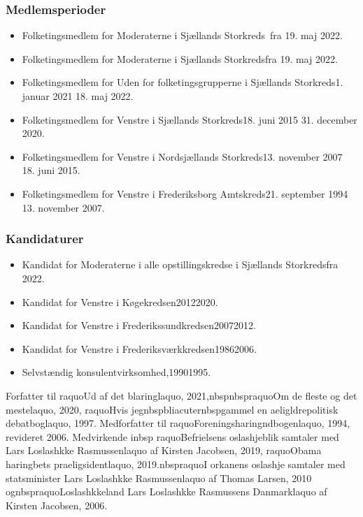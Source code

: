 \documentclass[11pt, a4paper]{awesome-cv}
\begin{document}
\begin{cvletter}
\subsubsection*{Medlemsperioder}
\begin{itemize}
\item Folketingsmedlem for Moderaterne i Sjællands Storkreds fra 19. maj 2022.
\item Folketingsmedlem for Moderaterne i Sjællands Storkredsfra 19. maj 2022.
\item Folketingsmedlem for Uden for folketingsgrupperne i Sjællands Storkreds1. januar 2021  18. maj 2022.
\item Folketingsmedlem for Venstre i Sjællands Storkreds18. juni 2015  31. december 2020.
\item Folketingsmedlem for Venstre i Nordsjællands Storkreds13. november 2007  18. juni 2015.
\item Folketingsmedlem for Venstre i Frederiksborg Amtskreds21. september 1994  13. november 2007.
\end{itemize}
\subsubsection*{Kandidaturer}
\begin{itemize}
\item Kandidat for Moderaterne i alle opstillingskredse i Sjællands Storkredsfra 2022.
\item Kandidat for Venstre i Køgekredsen20122020.
\item Kandidat for Venstre i Frederikssundkredsen20072012.
\item Kandidat for Venstre i Frederiksværkkredsen19862006.
\end{itemize}
\begin{itemize}
\item Selvstændig konsulentvirksomhed,19901995.
\end{itemize}
Forfatter til raquoUd af det blaringlaquo, 2021,nbspnbspraquoOm de fleste og det mestelaquo, 2020, raquoHvis jegnbspbliacuternbspgammel  en aeligldrepolitisk debatboglaquo, 1997. Medforfatter til raquoForeningsharingndbogenlaquo, 1994, revideret 2006. Medvirkende inbsp raquoBefrielsens oslashjeblik  samtaler med Lars Loslashkke Rasmussenlaquo af Kirsten Jacobsen, 2019, raquoObama  haringbets praeligsidentlaquo, 2019.nbspraquoI orkanens oslashje  samtaler med statsminister Lars Loslashkke Rasmussenlaquo af Thomas Larsen, 2010 ognbspraquoLoslashkkeland  Lars Loslashkke Rasmussens Danmarklaquo af Kirsten Jacobsen, 2006.

\end{cvletter}
\end{document}
